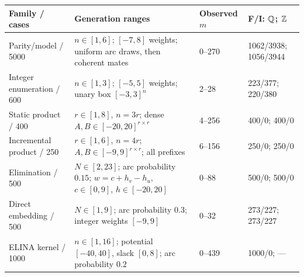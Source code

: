 \begin{tabularx}{\textwidth}{@{}P{.20\textwidth}Y P{.13\textwidth}P{.18\textwidth}@{}}
\toprule
Family / cases & Generation ranges & Observed $m$ & F/I: $\mathbb Q$; $\mathbb Z$\\
\midrule
Parity/model / 5000 & $n\in[1,6]$; $[-7,8]$ weights; uniform arc draws, then coherent mates & 0--270 & 1062/3938; 1056/3944\\
Integer enumeration / 600 & $n\in[1,3]$; $[-5,5]$ weights; unary box $[-3,3]^n$ & 2--28 & 223/377; 220/380\\
Static product / 400 & $r\in[1,8]$, $n=3r$; dense $A,B\in[-20,20]^{r\times r}$ & 4--256 & 400/0; 400/0\\
Incremental product / 250 & $r\in[1,6]$, $n=4r$; $A,B\in[-9,9]^{r\times r}$; all prefixes & 6--156 & 250/0; 250/0\\
Elimination / 500 & $N\in[2,23]$; arc probability $0.15$; $w=c+h_v-h_u$, $c\in[0,9]$, $h\in[-20,20]$ & 0--88 & 500/0; 500/0\\
Direct embedding / 500 & $N\in[1,9]$; arc probability $0.3$; integer weights $[-9,9]$ & 0--32 & 273/227; 273/227\\
ELINA kernel / 1000 & $n\in[1,16]$; potential $[-40,40]$, slack $[0,8]$; arc probability $0.2$ & 0--439 & 1000/0; ---\\
\bottomrule
\end{tabularx}
